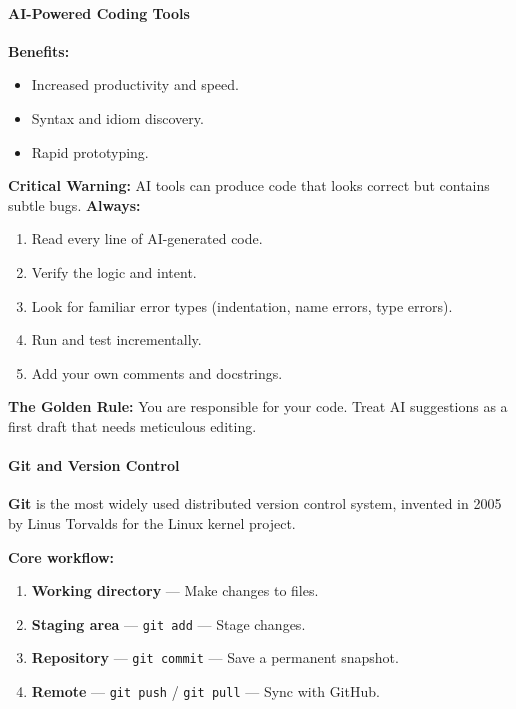 \documentclass[
  justified,
  openright,
]{tufte-book}
\let\subsection\paragraph
\let\paragraph\paragraph
\let\subsection\paragraph
\let\paragraph\paragraph
\providecommand{\tightlist}{%
  \setlength{\itemsep}{0pt}\setlength{\parskip}{0pt}}
\begin{document}
\subsection{AI-Powered Coding Tools}\label{ai-powered-coding-tools}

\textbf{Benefits:}

\begin{itemize}
\tightlist
\item
  Increased productivity and speed.
\item
  Syntax and idiom discovery.
\item
  Rapid prototyping.
\end{itemize}

\textbf{Critical Warning:} AI tools can produce code that looks correct
but contains subtle bugs. \textbf{Always:}

\begin{enumerate}
\def\labelenumi{\arabic{enumi}.}
\tightlist
\item
  Read every line of AI-generated code.
\item
  Verify the logic and intent.
\item
  Look for familiar error types (indentation, name errors, type errors).
\item
  Run and test incrementally.
\item
  Add your own comments and docstrings.
\end{enumerate}

\textbf{The Golden Rule:} You are responsible for your code. Treat AI
suggestions as a first draft that needs meticulous editing.

\subsection{Git and Version Control}\label{git-and-version-control}

\textbf{Git} is the most widely used distributed version control system,
invented in 2005 by Linus Torvalds for the Linux kernel project.

\textbf{Core workflow:}

\begin{enumerate}
\def\labelenumi{\arabic{enumi}.}
\tightlist
\item
  \textbf{Working directory} --- Make changes to files.
\item
  \textbf{Staging area} --- \texttt{git\ add} --- Stage changes.
\item
  \textbf{Repository} --- \texttt{git\ commit} --- Save a permanent
  snapshot.
\item
  \textbf{Remote} --- \texttt{git\ push} / \texttt{git\ pull} --- Sync
  with GitHub.
\end{enumerate}
\end{document}

